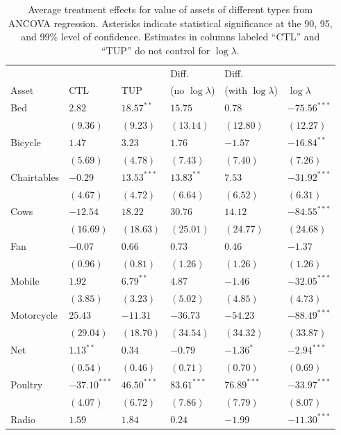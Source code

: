 \documentclass[11pt]{article}
\begin{document}
\begin{table}[htb]
\caption{\label{tab:asset_values_results}Average treatment effects for value of assets of different types from ANCOVA regression. Asterisks indicate statistical significance at the 90, 95, and 99\% level of confidence.  Estimates in columns labeled ``CTL'' and ``TUP'' do not control for $\log\lambda$.}
\centering
\begin{tabular}{llllll}
 &  &  & Diff. & Diff. & \\
Asset & CTL & TUP & (no $\log\lambda$) & (with $\log\lambda$) & $\log\lambda$\\
\hline
Bed & $2.82$ & $18.57^{**}$ & $15.75$ & $0.78$ & $-75.56^{***}$\\
 & $(9.36)$ & $(9.23)$ & $(13.14)$ & $(12.80)$ & $(12.27)$\\
Bicycle & $1.47$ & $3.23$ & $1.76$ & $-1.57$ & $-16.84^{**}$\\
 & $(5.69)$ & $(4.78)$ & $(7.43)$ & $(7.40)$ & $(7.26)$\\
Chairtables & $-0.29$ & $13.53^{***}$ & $13.83^{**}$ & $7.53$ & $-31.92^{***}$\\
 & $(4.67)$ & $(4.72)$ & $(6.64)$ & $(6.52)$ & $(6.31)$\\
Cows & $-12.54$ & $18.22$ & $30.76$ & $14.12$ & $-84.55^{***}$\\
 & $(16.69)$ & $(18.63)$ & $(25.01)$ & $(24.77)$ & $(24.68)$\\
Fan & $-0.07$ & $0.66$ & $0.73$ & $0.46$ & $-1.37$\\
 & $(0.96)$ & $(0.81)$ & $(1.26)$ & $(1.26)$ & $(1.26)$\\
Mobile & $1.92$ & $6.79^{**}$ & $4.87$ & $-1.46$ & $-32.05^{***}$\\
 & $(3.85)$ & $(3.23)$ & $(5.02)$ & $(4.85)$ & $(4.73)$\\
Motorcycle & $25.43$ & $-11.31$ & $-36.73$ & $-54.23$ & $-88.49^{***}$\\
 & $(29.04)$ & $(18.70)$ & $(34.54)$ & $(34.32)$ & $(33.87)$\\
Net & $1.13^{**}$ & $0.34$ & $-0.79$ & $-1.36^{*}$ & $-2.94^{***}$\\
 & $(0.54)$ & $(0.46)$ & $(0.71)$ & $(0.70)$ & $(0.69)$\\
Poultry & $-37.10^{***}$ & $46.50^{***}$ & $83.61^{***}$ & $76.89^{***}$ & $-33.97^{***}$\\
 & $(4.07)$ & $(6.72)$ & $(7.86)$ & $(7.79)$ & $(8.07)$\\
Radio & $1.59$ & $1.84$ & $0.24$ & $-1.99$ & $-11.30^{***}$\\

\end{tabular}
\end{table}
\end{document}

